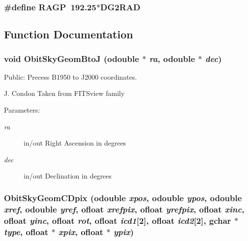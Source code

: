 \subsubsection{\setlength{\rightskip}{0pt plus 5cm}\#define RAGP\ 192.25$\ast$DG2RAD}\label{ObitSkyGeom_8c_a0}




\subsection{Function Documentation}
\subsubsection{\setlength{\rightskip}{0pt plus 5cm}void Obit\-Sky\-Geom\-Bto\-J ({\bf odouble} $\ast$ {\em ra}, {\bf odouble} $\ast$ {\em dec})}\label{ObitSkyGeom_8c_a14}


Public: Precess B1950 to J2000 coordinates. 

J. Condon Taken from FITSview family \begin{Desc}
\item[Parameters:]
\begin{description}
\item[{\em ra}]in/out Right Ascension in degrees \item[{\em dec}]in/out Declination in degrees \end{description}
\end{Desc}
\subsubsection{ Obit\-Sky\-Geom\-CDpix ({\bf odouble} {\em xpos}, {\bf odouble} {\em ypos}, {\bf odouble} {\em xref}, {\bf odouble} {\em yref}, {\bf ofloat} {\em xrefpix}, {\bf ofloat} {\em yrefpix}, {\bf ofloat} {\em xinc}, {\bf ofloat} {\em yinc}, {\bf ofloat} {\em rot}, {\bf ofloat} {\em icd1}[2], {\bf ofloat} {\em icd2}[2], gchar $\ast$ {\em type}, {\bf ofloat} $\ast$ {\em xpix}, {\bf ofloat} $\ast$ {\em ypix})}\label{ObitSkyGeom_8c_a12}



